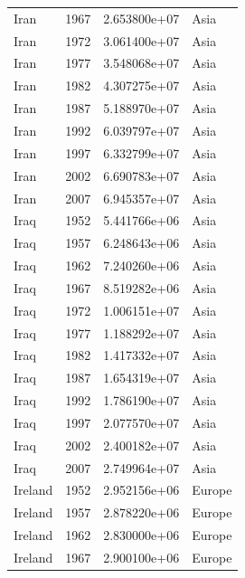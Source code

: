 \documentclass[
  letterpaper,
  DIV=11,
  numbers=noendperiod]{scrreprt}
\begin{document}
\begin{tcolorbox}
\begin{tabular}{lrrl}
Iran                     &  1967 &  2.653800e+07 &      Asia \\
Iran                     &  1972 &  3.061400e+07 &      Asia \\
Iran                     &  1977 &  3.548068e+07 &      Asia \\
Iran                     &  1982 &  4.307275e+07 &      Asia \\
Iran                     &  1987 &  5.188970e+07 &      Asia \\
Iran                     &  1992 &  6.039797e+07 &      Asia \\
Iran                     &  1997 &  6.332799e+07 &      Asia \\
Iran                     &  2002 &  6.690783e+07 &      Asia \\
Iran                     &  2007 &  6.945357e+07 &      Asia \\
Iraq                     &  1952 &  5.441766e+06 &      Asia \\
Iraq                     &  1957 &  6.248643e+06 &      Asia \\
Iraq                     &  1962 &  7.240260e+06 &      Asia \\
Iraq                     &  1967 &  8.519282e+06 &      Asia \\
Iraq                     &  1972 &  1.006151e+07 &      Asia \\
Iraq                     &  1977 &  1.188292e+07 &      Asia \\
Iraq                     &  1982 &  1.417332e+07 &      Asia \\
Iraq                     &  1987 &  1.654319e+07 &      Asia \\
Iraq                     &  1992 &  1.786190e+07 &      Asia \\
Iraq                     &  1997 &  2.077570e+07 &      Asia \\
Iraq                     &  2002 &  2.400182e+07 &      Asia \\
Iraq                     &  2007 &  2.749964e+07 &      Asia \\
Ireland                  &  1952 &  2.952156e+06 &    Europe \\
Ireland                  &  1957 &  2.878220e+06 &    Europe \\
Ireland                  &  1962 &  2.830000e+06 &    Europe \\
Ireland                  &  1967 &  2.900100e+06 &    Europe \\

\end{tabular}
\end{tcolorbox}
\end{document}
